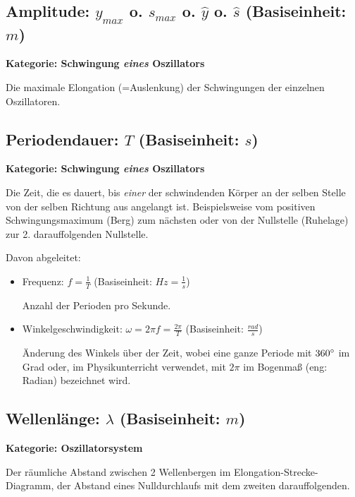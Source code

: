 \subsection[Amplitude]{Amplitude: $y_{max}$ o. $s_{max}$ o. $\hat{y}$ o. $\hat{s}$ (Basiseinheit: $m$)}

\textbf{Kategorie: Schwingung \textit{eines} Oszillators}

\noindent Die maximale Elongation (=\glqq Auslenkung\grqq) der Schwingungen der einzelnen Oszillatoren.



\subsection[Periodendauer]{Periodendauer: $T$ (Basiseinheit: $s$)}

\textbf{Kategorie: Schwingung \textit{eines} Oszillators}
	
\noindent Die Zeit, die es dauert, bis \emph{einer} der schwindenden Körper an der selben Stelle von der selben Richtung aus angelangt ist. Beispielsweise vom positiven Schwingungsmaximum (\glqq Berg\grqq) zum nächsten oder von der Nullstelle (\glqq Ruhelage\grqq) zur 2. darauffolgenden Nullstelle.

Davon abgeleitet:
\begin{itemize}
	\item Frequenz: $f=\frac{1}{T}$ (Basiseinheit: $Hz=\frac{1}{s}$)
	
	Anzahl der Perioden pro Sekunde.
	\item Winkelgeschwindigkeit: $\omega=2 \pi f=\frac{2 \pi}{T}$ (Basiseinheit: $\frac{rad}{s}$)
		
	Änderung des Winkels über der Zeit, wobei eine ganze Periode mit $360 \degree$ im Grad oder, im Physikunterricht verwendet, mit $2 \pi$ im Bogenmaß (eng: \glqq Radian\grqq) bezeichnet wird.
\end{itemize}



\subsection[Wellenlänge]{Wellenlänge: $\lambda$ (Basiseinheit: $m$)}

\textbf{Kategorie: Oszillatorsystem}

\noindent Der räumliche Abstand zwischen 2 Wellenbergen im Elongation-Strecke-Diagramm, der Abstand eines Nulldurchlaufs mit dem zweiten darauffolgenden.



